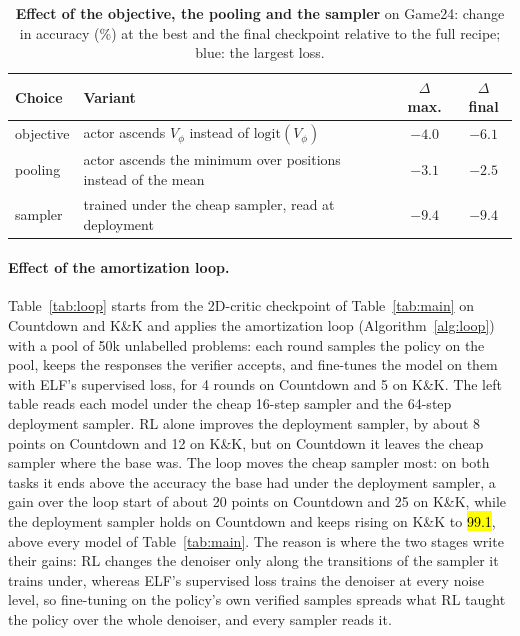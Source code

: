 \begin{table}[!t]
\centering\small
\caption{\textbf{Effect of the objective, the pooling and the sampler} on Game24: change in accuracy (\%) at the best and the final checkpoint relative to the full recipe; blue: the largest loss.}
\label{tab:needs}
\setlength{\tabcolsep}{5pt}
\begin{tabular*}{\linewidth}{@{\extracolsep{\fill}}llcc@{}}
\toprule
\textbf{Choice} & \textbf{Variant} & \textbf{$\Delta$ max.} & \textbf{$\Delta$ final} \\
\midrule
objective & actor ascends $V_\phi$ instead of $\mathrm{logit}(V_\phi)$ & $-4.0$ & $-6.1$ \\
pooling & actor ascends the minimum over positions instead of the mean & $-3.1$ & $-2.5$ \\
sampler & trained under the cheap sampler, read at deployment & \cellcolor{blue!12}$-9.4$ & \cellcolor{blue!12}$-9.4$ \\
\bottomrule
\end{tabular*}
\end{table}

\paragraph{Effect of the amortization loop.}\label{sec:exp_loop}
Table~\ref{tab:loop} starts from the 2D-critic checkpoint of Table~\ref{tab:main} on Countdown and K\&K and applies the amortization loop (Algorithm~\ref{alg:loop}) with a pool of 50k unlabelled problems: each round samples the policy on the pool, keeps the responses the verifier accepts, and fine-tunes the model on them with ELF's supervised loss, for 4 rounds on Countdown and 5 on K\&K. The left table reads each model under the cheap 16-step sampler and the 64-step deployment sampler. RL alone improves the deployment sampler, by about 8 points on Countdown and 12 on K\&K, but on Countdown it leaves the cheap sampler where the base was. The loop moves the cheap sampler most: on both tasks it ends above the accuracy the base had under the deployment sampler, a gain over the loop start of about 20 points on Countdown and 25 on K\&K, while the deployment sampler holds on Countdown and keeps rising on K\&K to \hl{99.1}, above every model of Table~\ref{tab:main}. The reason is where the two stages write their gains: RL changes the denoiser only along the transitions of the sampler it trains under, whereas ELF's supervised loss trains the denoiser at every noise level, so fine-tuning on the policy's own verified samples spreads what RL taught the policy over the whole denoiser, and every sampler reads it.

